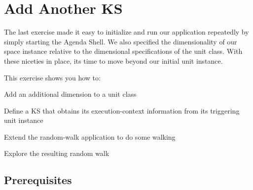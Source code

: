 \documentclass[10pt,twoside,english,pdftex]{article}
\begin{document}

\T\markright{}%
\T\pagestyle{plain}
\T\cleardoublepage
\W{}
\T\pagestyle{fancy}
\T\thispagestyle{fancybottom}
\T\renewcommand{\headrulewidth}{0pt}
\section{Add Another KS}
\label{sec:another-ks}%

The last exercise made it easy to initialize and run our application
repeatedly by simply starting the Agenda Shell.  We also specified the
dimensionality of our  space instance relative to the
dimensional specifications of the  unit class.  With these
niceties in place, its time to move beyond our initial  unit
instance.

\fndocrule

This exercise shows you how to:
\begin{tightitemize}
\item Add an additional dimension to a unit class
\item Define a KS that obtains its execution-context information from its
  triggering unit instance
\item Extend the random-walk application to do some walking
\item Explore the resulting random walk
\end{tightitemize}

\fndocrule

\subsection*{Prerequisites}
\end{document}
